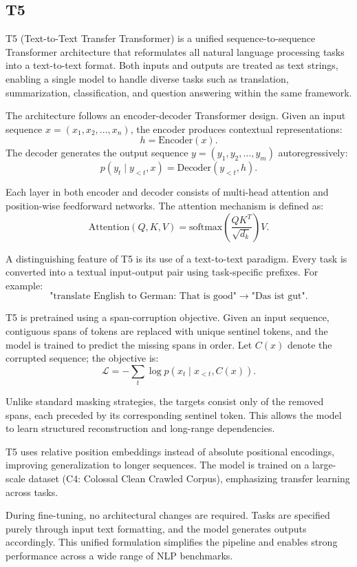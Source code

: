 \documentclass[10pt,a4paper]{article}
\begin{document}
\subsection{T5}
T5 (Text-to-Text Transfer Transformer) is a unified sequence-to-sequence Transformer architecture that reformulates all natural language processing tasks into a text-to-text format. Both inputs and outputs are treated as text strings, enabling a single model to handle diverse tasks such as translation, summarization, classification, and question answering within the same framework.

The architecture follows an encoder-decoder Transformer design. Given an input sequence \(x = (x_1, x_2, \dots, x_n)\), the encoder produces contextual representations:
\[
h = \text{Encoder}(x).
\]
The decoder generates the output sequence \(y = (y_1, y_2, \dots, y_m)\) autoregressively:
\[
p(y_t \mid y_{<t}, x) = \text{Decoder}(y_{<t}, h).
\]

Each layer in both encoder and decoder consists of multi-head attention and position-wise feedforward networks. The attention mechanism is defined as:
\[
\text{Attention}(Q,K,V) = \text{softmax}\left(\frac{QK^T}{\sqrt{d_k}}\right)V.
\]

A distinguishing feature of T5 is its use of a text-to-text paradigm. Every task is converted into a textual input-output pair using task-specific prefixes. For example:
\[
\text{"translate English to German: That is good"} \rightarrow \text{"Das ist gut"}.
\]

T5 is pretrained using a span-corruption objective. Given an input sequence, contiguous spans of tokens are replaced with unique sentinel tokens, and the model is trained to predict the missing spans in order. Let \(C(x)\) denote the corrupted sequence; the objective is:
\[
\mathcal{L} = - \sum_{t} \log p(x_t \mid x_{<t}, C(x)).
\]

Unlike standard masking strategies, the targets consist only of the removed spans, each preceded by its corresponding sentinel token. This allows the model to learn structured reconstruction and long-range dependencies.

T5 uses relative position embeddings instead of absolute positional encodings, improving generalization to longer sequences. The model is trained on a large-scale dataset (C4: Colossal Clean Crawled Corpus), emphasizing transfer learning across tasks.

During fine-tuning, no architectural changes are required. Tasks are specified purely through input text formatting, and the model generates outputs accordingly. This unified formulation simplifies the pipeline and enables strong performance across a wide range of NLP benchmarks.
\end{document}
